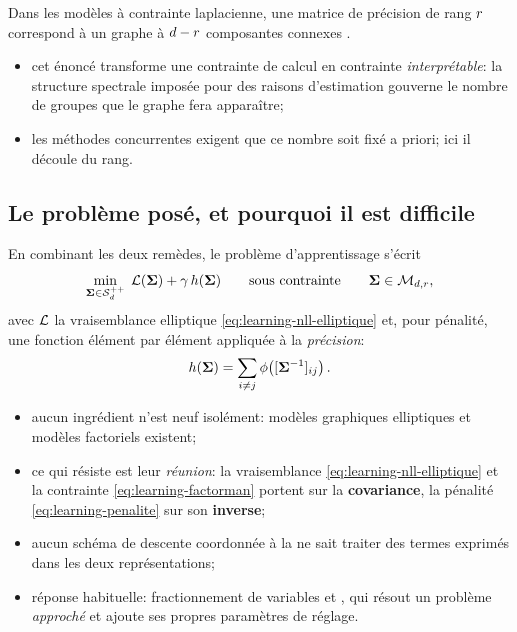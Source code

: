 \begin{property}
\label{prop:learning-composantes}
  Dans les modèles à contrainte laplacienne, une matrice de précision de rang
  $r$ correspond à un graphe à $d-r$ composantes connexes
  .
\end{property}

\begin{itemize}
  \item cet énoncé transforme une contrainte de calcul en contrainte
    \emph{interprétable}: la structure spectrale imposée pour des raisons
    d'estimation gouverne le nombre de groupes que le graphe fera apparaître;
  \item les méthodes concurrentes exigent que ce nombre soit fixé a priori;
    ici il découle du rang.
\end{itemize}

\subsection{Le problème posé, et pourquoi il est difficile}
\label{subsec:learning-probleme-graphe}

En combinant les deux remèdes, le problème d'apprentissage s'écrit
\begin{equation}
  \min_{\boldsymbol{\Sigma}\in\mathcal{S}_{d}^{++}}
  \;
  \mathcal{L}(\boldsymbol{\Sigma})+\gamma\,h(\boldsymbol{\Sigma})
  \qquad\text{sous contrainte}\qquad
  \boldsymbol{\Sigma}\in\mathcal{M}_{d,r},
  \label{eq:learning-probleme-gfm}
\end{equation}
avec $\mathcal{L}$ la vraisemblance elliptique \cref{eq:learning-nll-elliptique} et,
pour pénalité, une fonction élément par élément appliquée à la
\emph{précision}:
\begin{equation}
  h(\boldsymbol{\Sigma})=\sum_{i\neq j}\phi\!\left([{\boldsymbol{\Sigma}}^{-1}]_{ij}\right).
  \label{eq:learning-penalite}
\end{equation}

\begin{remark}
\label{rem:learning-difficulte}
  \begin{itemize}
    \item aucun ingrédient n'est neuf isolément: modèles graphiques elliptiques
      et modèles factoriels existent;
    \item ce qui résiste est leur \emph{réunion}: la vraisemblance
      \cref{eq:learning-nll-elliptique} et la contrainte
      \cref{eq:learning-factorman} portent sur la \textbf{covariance}, la
      pénalité \cref{eq:learning-penalite} sur son \textbf{inverse};
    \item aucun schéma de descente coordonnée à la  ne sait
      traiter des termes exprimés dans les deux représentations;
    \item réponse habituelle: fractionnement de variables et ,
      qui résout un problème \emph{approché} et ajoute ses propres paramètres
      de réglage.
  \end{itemize}
  \leavevmode
\end{remark}

